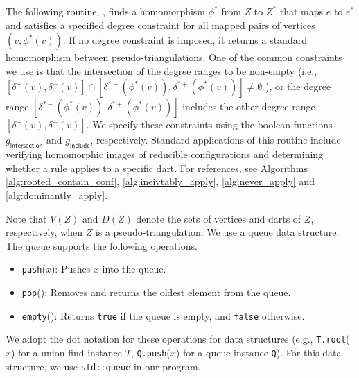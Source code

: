 \documentclass[main.tex]{subfiles}
\begin{document}
\newcommand{\gIntersection}{g_\textsf{intersection}}
\newcommand{\gInclude}{g_\textsf{include}}
The following routine, \homomorphism, finds a homomorphism $\phi^*$ from $Z$ to $Z^*$ that maps $e$ to $e^*$ and satisfies a specified degree constraint for all mapped pairs of vertices $(v, \phi^*(v))$.
If no degree constraint is imposed, it returns a standard homomorphism between pseudo-triangulations.
One of the common constraints we use is that the intersection of the degree ranges to be non-empty (i.e., $[\delta^-(v), \delta^+(v)] \cap [\delta^{*-}(\phi^*(v)), \delta^{*+}(\phi^*(v))] \neq \emptyset$ ), or the degree range $[\delta^{*-}(\phi^*(v)), \delta^{*+}(\phi^*(v))]$ includes the other degree range $[\delta^-(v), \delta^+(v)]$.
We specify these constraints using the boolean functions $\gIntersection$ and $\gInclude$, respectively.
Standard applications of this routine include verifying homomorphic images of reducible configurations and determining whether a rule applies to a specific dart.
For references, see Algorithms \ref{alg:rooted_contain_conf}, \ref{alg:ineivtably_apply}, \ref{alg:never_apply} and \ref{alg:dominantly_apply}.

Note that $V(Z)$ and $D(Z)$ denote the sets of vertices and darts of $Z$, respectively, when $Z$ is a pseudo-triangulation.
We use a queue data structure. The queue supports 
the following operations.

\begin{itemize}
    \item \texttt{push}($x$): Pushes $x$ into the queue.
    \item \texttt{pop}(): Removes and returns the oldest element from the queue.
    \item \texttt{empty}(): Returns \texttt{true} if the queue is empty, and \texttt{false} otherwise.
\end{itemize}

We adopt the dot notation for these operations for data structures (e.g., \texttt{T.root}($x$) for a union-find instance $T$, \texttt{Q.push}($x$) for a queue instance \texttt{Q}).
For this data structure, we use \texttt{std::queue} in our \Cpp program.
\end{document}
